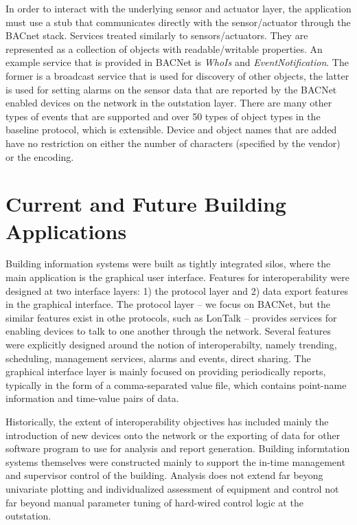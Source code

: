 In order to interact with the underlying sensor and actuator layer, the application must use a stub that communicates directly with the 
sensor/actuator through the BACnet stack.  Services treated similarly to sensors/actuators.  They are represented as a collection of 
objects with readable/writable properties.  An example service that is provided in BACNet is  \emph{WhoIs} and \emph{EventNotification}.
The former is a broadcast service that is used for discovery of other objects, the latter is used for setting alarms on the sensor data that
are reported by the BACNet enabled devices on the network in the outstation layer.  There are many other types of events that are supported 
and over 50 types of object types in the baseline protocol, which is extensible.  Device and object names that are added have no restriction
on either the number of characters (specified by the vendor) or the encoding.




\section{Current and Future Building Applications}
Building information systems were built as tightly integrated silos, where the main application is the graphical user interface.
Features for interoperability were designed at two interface layers: 1) the protocol layer and 2) data export features in the 
graphical interface.  The protocol layer -- we focus on BACNet, but the similar features exist in othe protocols, such as LonTalk --
provides services for enabling devices to talk to one another through the network.  Several features were explicitly designed around
the notion of interoperabilty, namely trending, scheduling, management services, alarms and events, direct sharing.  The graphical
interface layer is mainly focused on providing periodically reports, typically in the form of a comma-separated value file, which
contains point-name information and time-value pairs of data.

Historically, the extent of interoperability objectives has included mainly the introduction of new devices onto the network or
the exporting of data for other software program to use for analysis and report generation.  Building informtation systems themselves
were constructed mainly to support the in-time management and supervisor control of the building.  Analysis does not 
extend far beyong univariate plotting and individualized assessment of equipment and control not far beyond manual parameter tuning
of hard-wired control logic at the outstation.


